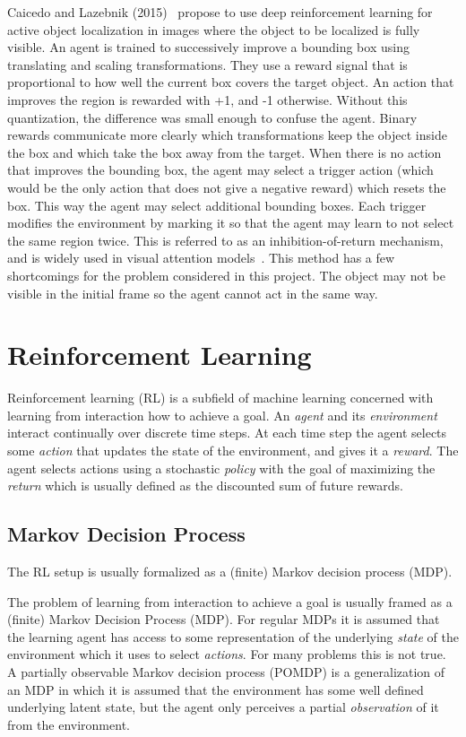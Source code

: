 Caicedo and Lazebnik (2015)~\cite{aol} propose to use deep reinforcement learning for active object localization in images where the object to be localized is fully visible. An agent is trained to successively improve a bounding box using translating and scaling transformations. They use a reward signal that is proportional to how well the current box covers the target object. An action that improves the region is rewarded with +1, and -1 otherwise. Without this quantization, the difference was small enough to confuse the agent. Binary rewards communicate more clearly which transformations keep the object inside the box and which take the box away from the target. When there is no action that improves the bounding box, the agent may select a trigger action (which would be the only action that does not give a negative reward) which resets the box. This way the agent may select additional bounding boxes. Each trigger modifies the environment by marking it so that the agent may learn to not select the same region twice. This is referred to as an inhibition-of-return mechanism, and is widely used in visual attention models~\cite{16 in aol}. This method has a few shortcomings for the problem considered in this project. The object may not be visible in the initial frame so the agent cannot act in the same way. 

\section{Reinforcement Learning}

Reinforcement learning (RL) is a subfield of machine learning concerned with learning from interaction how to achieve a goal. An \textit{agent} and its \textit{environment} interact continually over discrete time steps. At each time step the agent selects some \textit{action} that updates the state of the environment, and gives it a \textit{reward}. The agent selects actions using a stochastic \textit{policy} with the goal of maximizing the \textit{return} which is usually defined as the discounted sum of future rewards.

\subsection{Markov Decision Process}

The RL setup is usually formalized as a (finite) Markov decision process (MDP).

The problem of learning from interaction to achieve a goal is usually framed as a (finite) Markov Decision Process (MDP). For regular MDPs it is assumed that the learning agent has access to some representation of the underlying \textit{state} of the environment which it uses to select \textit{actions}. For many problems this is not true. A partially observable Markov decision process (POMDP) is a generalization of an MDP in which it is assumed that the environment has some well defined underlying latent state, but the agent only perceives a partial \textit{observation} of it from the environment. 


